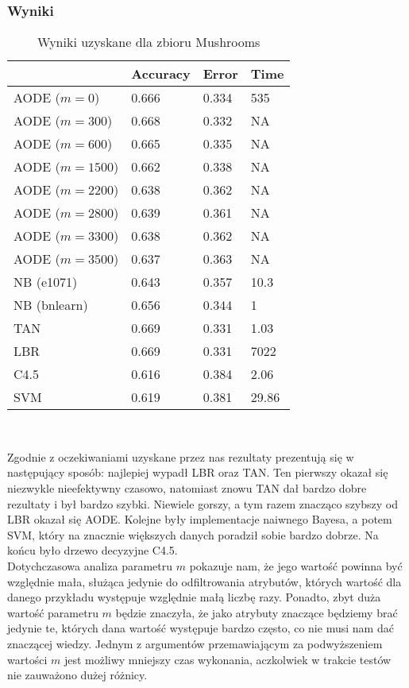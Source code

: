 \documentclass[16]{article}
\begin{document}
\subsubsection{Wyniki}
\begin{table}[ht]
\begin{center}
\begin{tabular}{ |l|l|l|l| }
\hline
&  Accuracy & Error & Time
\\ \hline
AODE ($m = 0$) & 0.666 & 0.334 & 535 
\\ \hline
AODE ($m = 300$) & 0.668 & 0.332 & NA
\\ \hline
AODE ($m = 600$) & 0.665 & 0.335 & NA
\\ \hline
AODE ($m = 1500$) & 0.662 & 0.338 & NA
\\ \hline
AODE ($m = 2200$) & 0.638 & 0.362 & NA
\\ \hline
AODE ($m = 2800$) & 0.639 & 0.361 & NA
\\ \hline
AODE ($m = 3300$) & 0.638 & 0.362 & NA
\\ \hline
AODE ($m = 3500$) & 0.637 & 0.363 & NA
\\ \hline
NB (e1071) & 0.643 & 0.357 & 10.3
\\ \hline
NB (bnlearn) & 0.656 & 0.344 & 1
\\ \hline
TAN & 0.669 & 0.331 & 1.03
\\ \hline
LBR & 0.669 & 0.331 & 7022
\\ \hline
C4.5 & 0.616 & 0.384 & 2.06
\\ \hline
SVM & 0.619 & 0.381 & 29.86
\\ \hline
\end{tabular} \\
\caption{Wyniki uzyskane dla zbioru Mushrooms}
\end{center}
\end{table}
Zgodnie z oczekiwaniami uzyskane przez nas rezultaty prezentują się w następujący sposób: najlepiej wypadł LBR oraz TAN. Ten pierwszy okazał się niezwykle nieefektywny czasowo, natomiast znowu TAN dał bardzo dobre rezultaty i był bardzo szybki. Niewiele gorszy, a tym razem znacząco szybszy od LBR okazał się AODE. Kolejne były implementacje naiwnego Bayesa, a potem SVM, który na znacznie większych danych poradził sobie bardzo dobrze. Na końcu było drzewo decyzyjne C4.5. \\ Dotychczasowa analiza parametru $m$ pokazuje nam, że jego wartość powinna być względnie mała, służąca jedynie do odfiltrowania atrybutów, których wartość dla danego przykładu występuje względnie małą liczbę razy. Ponadto, zbyt duża wartość parametru $m$ będzie znaczyła, że jako atrybuty znaczące będziemy brać jedynie te, których dana wartość występuje bardzo często, co nie musi nam dać znaczącej wiedzy. Jednym z argumentów przemawiającym za podwyższeniem wartości $m$ jest możliwy mniejszy czas wykonania, aczkolwiek w trakcie testów nie zauważono dużej różnicy.
\end{document}
